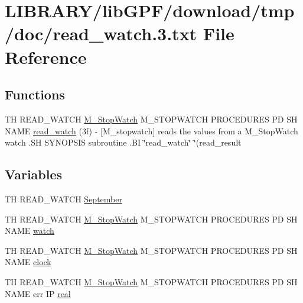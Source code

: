 \hypertarget{read__watch_83_8txt}{}\section{L\+I\+B\+R\+A\+R\+Y/lib\+G\+P\+F/download/tmp/doc/read\+\_\+watch.3.txt File Reference}
\label{read__watch_83_8txt}
\subsection*{Functions}
\begin{DoxyCompactItemize}
\item 
TH R\+E\+A\+D\+\_\+\+W\+A\+T\+CH \hyperlink{option__stopwatch_83_8txt_aa2011fc45a5e502e87ee50996a8a9305}{M\+\_\+\+Stop\+Watch} M\+\_\+\+S\+T\+O\+P\+W\+A\+T\+CH P\+R\+O\+C\+E\+D\+U\+R\+ES PD SH N\+A\+ME \hyperlink{read__watch_83_8txt_a9a59c617348dee220b1c77cbc6d39050}{read\+\_\+watch} (3f) -\/ \mbox{[}\+M\+\_\+stopwatch\mbox{]} reads the values from a M\+\_\+\+Stop\+Watch watch .\+S\+H S\+Y\+N\+O\+P\+S\+I\+S subroutine .\+B\+I \char`\"{}read\+\_\+watch\char`\"{} \char`\"{}(read\+\_\+result
\end{DoxyCompactItemize}
\subsection*{Variables}
\begin{DoxyCompactItemize}
\item 
TH R\+E\+A\+D\+\_\+\+W\+A\+T\+CH \hyperlink{read__watch_83_8txt_a01edc0babc2c7bff9f6dea0d461744bc}{September}
\item 
TH R\+E\+A\+D\+\_\+\+W\+A\+T\+CH \hyperlink{option__stopwatch_83_8txt_aa2011fc45a5e502e87ee50996a8a9305}{M\+\_\+\+Stop\+Watch} M\+\_\+\+S\+T\+O\+P\+W\+A\+T\+CH P\+R\+O\+C\+E\+D\+U\+R\+ES PD SH N\+A\+ME \hyperlink{read__watch_83_8txt_ad2129669fa47b8899641309620add095}{watch}
\item 
TH R\+E\+A\+D\+\_\+\+W\+A\+T\+CH \hyperlink{option__stopwatch_83_8txt_aa2011fc45a5e502e87ee50996a8a9305}{M\+\_\+\+Stop\+Watch} M\+\_\+\+S\+T\+O\+P\+W\+A\+T\+CH P\+R\+O\+C\+E\+D\+U\+R\+ES PD SH N\+A\+ME \hyperlink{read__watch_83_8txt_a6b8c46608167c7c707dcc341e6a30f47}{clock}
\item 
TH R\+E\+A\+D\+\_\+\+W\+A\+T\+CH \hyperlink{option__stopwatch_83_8txt_aa2011fc45a5e502e87ee50996a8a9305}{M\+\_\+\+Stop\+Watch} M\+\_\+\+S\+T\+O\+P\+W\+A\+T\+CH P\+R\+O\+C\+E\+D\+U\+R\+ES PD SH N\+A\+ME err IP \hyperlink{read__watch_83_8txt_abdb62bde002f38ef75f810d3a905a823}{real}
\end{DoxyCompactItemize}


